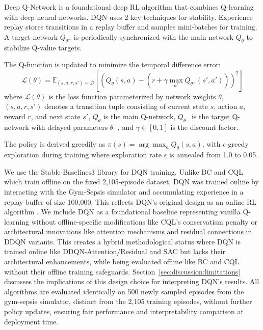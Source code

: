 Deep Q-Network \citep{mnih2015dqn} is a foundational deep RL algorithm that combines Q-learning with deep neural networks. DQN uses 2 key techniques for stability. Experience replay stores transitions in a replay buffer and samples mini-batches for training. A target network $Q_{\theta^-}$ is periodically synchronized with the main network $Q_\theta$ to stabilize Q-value targets.

The Q-function is updated to minimize the temporal difference error:
\begin{equation}
\mathcal{L}(\theta) = \mathbb{E}_{(s,a,r,s') \sim \mathcal{D}} \left[ \left( Q_\theta(s,a) - \left( r + \gamma \max_{a'} Q_{\theta^-}(s', a') \right) \right)^2 \right]
\label{eq:dqn}
\end{equation}
where $\mathcal{L}(\theta)$ is the loss function parameterized by network weights $\theta$, $(s,a,r,s')$ denotes a transition tuple consisting of current state $s$, action $a$, reward $r$, and next state $s'$, $Q_\theta$ is the main Q-network, $Q_{\theta^-}$ is the target Q-network with delayed parameters $\theta^-$, and $\gamma \in [0,1]$ is the discount factor.

The policy is derived greedily as $\pi(s) = \arg\max_a Q_\theta(s, a)$, with $\epsilon$-greedy exploration during training where exploration rate $\epsilon$ is annealed from 1.0 to 0.05.

We use the Stable-Baselines3 library for DQN training. Unlike BC and CQL which train offline on the fixed 2,105-episode dataset, DQN was trained online by interacting with the Gym-Sepsis simulator and accumulating experience in a replay buffer of size 100,000. This reflects DQN's original design as an online RL algorithm \citep{mnih2015dqn}. We include DQN as a foundational baseline representing vanilla Q-learning without offline-specific modifications like CQL's conservatism penalty or architectural innovations like attention mechanisms and residual connections in DDQN variants. This creates a hybrid methodological status where DQN is trained online like DDQN-Attention/Residual and SAC but lacks their architectural enhancements, while being evaluated offline like BC and CQL without their offline training safeguards. Section~\ref{sec:discussion:limitations} discusses the implications of this design choice for interpreting DQN's results. All algorithms are evaluated identically on 500 newly sampled episodes from the gym-sepsis simulator, distinct from the 2,105 training episodes, without further policy updates, ensuring fair performance and interpretability comparison at deployment time.


